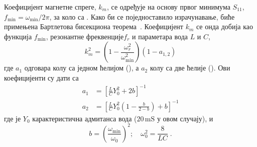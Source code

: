 Коефицијент магнетне спреге, $k_m$, се одређује на основу првог минимума $S_{11}$, $f_\text{min}=\omega_\text{min}/2\pi$,  за коло са . Како би се поједноставило израчунавање, биће примењена Бартлетова бисекциона теорема~\cite{bib20}. Коефицијент $k_m$ се онда добија као функција $f_\text{min}$, резонантне фреквенције$f_r$ и параметара вода $L$ и $C$,
\begin{equation}
k_m^2 = \left( 1 - \frac{\omega_r^2}{\omega_\text{min}^2} \right) \left( 1 - a_{1,2} \right) 
\end{equation}
где $a_1$ одговара колу са једном ћелијом (), а $a_2$ колу са две ћелије (). Ови коефицијенти су дати са
\begin{align}
a_1 & = \left[ \frac{L}{C}Y_0^2 + 2b \right]^{-1} \\
a_2 & = \left[ \frac{L}{C}Y_0^2 \left( 1 - \frac{b}{2-b} \right) + b \right]^{-1} 
\end{align}
где је $Y_0$ карактеристична адмитанса вода ($20\,\mathrm{mS}$ у овом случају), и 
\begin{equation*}
b  = \left( \frac{\omega_\text{min}}{\omega_0} \right)^2;\quad
\omega_0^2=\frac{8}{LC}\;.
\end{equation*}
